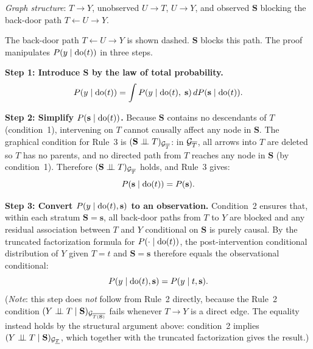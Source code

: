\documentclass[master.tex]{subfiles}
\begin{document}
\begin{tcolorbox}[defstyle, title={Proof of Theorem~\ref{w3:thm:backdoor} (Back-Door Formula) via Rule~3 and the Back-Door d-Separation Argument}]

\noindent\textit{Graph structure}: $T \to Y$, unobserved $U \to T$,
$U \to Y$, and observed $\mathbf{S}$ blocking the back-door path
$T \leftarrow U \to Y$.

\begin{center}
\end{center}

\noindent The back-door path $T \leftarrow U \to Y$ is shown dashed.
$\mathbf{S}$ blocks this path.  The proof manipulates $P(y \mid \mathrm{do}(t))$
in three steps.

\medskip
\noindent\textbf{Step 1: Introduce $\mathbf{S}$ by the law of total
probability.}
\[
  P(y \mid \mathrm{do}(t))
  = \int P(y \mid \mathrm{do}(t),\;\mathbf{s})\,dP(\mathbf{s} \mid \mathrm{do}(t)).
\]

\noindent\textbf{Step 2: Simplify $P(\mathbf{s} \mid \mathrm{do}(t))$.}
Because $\mathbf{S}$ contains no descendants of $T$ (condition~1),
intervening on $T$ cannot causally affect any node in $\mathbf{S}$.
The graphical condition for Rule~3 is $(\mathbf{S} \perp\!\!\!\perp T)_{\mathcal{G}_{\overline{T}}}$:
in $\mathcal{G}_{\overline{T}}$, all arrows into $T$ are deleted so $T$ has no
parents, and no directed path from $T$ reaches any node in $\mathbf{S}$
(by condition~1).  Therefore $(\mathbf{S} \perp\!\!\!\perp T)_{\mathcal{G}_{\overline{T}}}$
holds, and Rule~3 gives:
\[
  P(\mathbf{s} \mid \mathrm{do}(t)) = P(\mathbf{s}).
\]

\noindent\textbf{Step 3: Convert $P(y \mid \mathrm{do}(t), \mathbf{s})$ to an
observation.}
Condition~2 ensures that, within each stratum $\mathbf{S}=\mathbf{s}$,
all back-door paths from $T$ to $Y$ are blocked and any residual
association between $T$ and $Y$ conditional on $\mathbf{S}$ is purely
causal.  By the truncated factorization formula for $P(\cdot\mid\mathrm{do}(t))$,
the post-intervention conditional distribution of $Y$ given $T=t$ and
$\mathbf{S}=\mathbf{s}$ therefore equals the observational conditional:
\[
  P(y \mid \mathrm{do}(t), \mathbf{s}) = P(y \mid t, \mathbf{s}).
\]
(\textit{Note}: this step does \emph{not} follow from Rule~2 directly,
because the Rule~2 condition $(Y \perp\!\!\!\perp T \mid \mathbf{S})_{\mathcal{G}_{\overline{T(\mathbf{S})}}}$
fails whenever $T \to Y$ is a direct edge.  The equality instead holds by
the structural argument above: condition~2 implies
$(Y \perp\!\!\!\perp T \mid \mathbf{S})_{\mathcal{G}_{\underline{T}}}$, which together
with the truncated factorization gives the result.)


\end{tcolorbox}
\end{document}
